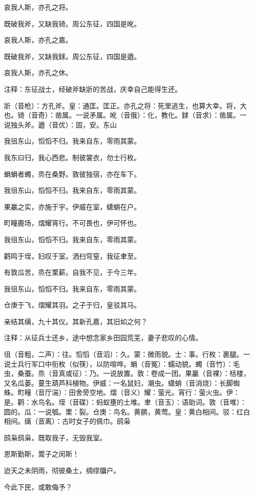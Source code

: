 \documentclass[12pt,UTF8]{ctexbook}
\begin{document}
哀我人斯，亦孔之将。

既破我斧，又缺我锜。周公东征，四国是吪。

哀我人斯，亦孔之嘉。

既破我斧，又缺我銶。周公东征，四国是遒。

哀我人斯，亦孔之休。

注释：东征战士，经破斧缺斨的苦战，庆幸自己能得生还。

斨（音枪）：方孔斧。皇：通匡。匡正。亦孔之将：死里逃生，也算大幸。将，大也。锜（音奇）：凿属。一说矛属。吪（音俄）：化，教化。銶（音求）：凿属。一说独头斧。遒（音优）：固，安。东山

我徂东山，慆慆不归。我来自东，零雨其蒙。

我东曰归，我心西悲。制彼裳衣，勿士行枚。

蜎蜎者蠋，烝在桑野。敦彼独宿，亦在车下。

我徂东山，慆慆不归。我来自东，零雨其蒙。

果臝之实，亦施于宇。伊威在室，蟏蛸在户。

町疃鹿场，熠耀宵行。不可畏也，伊可怀也。

我徂东山，慆慆不归。我来自东，零雨其蒙。

鹳鸣于垤，妇叹于室。洒扫穹窒，我征聿至。

有敦瓜苦，烝在栗薪。自我不见，于今三年。

我徂东山，慆慆不归。我来自东，零雨其蒙。

仓庚于飞，熠耀其羽。之子于归，皇驳其马。

亲结其缡，九十其仪。其新孔嘉，其旧如之何？

注释：从征兵士还乡，途中想念家乡田园荒芜，妻子悲叹的心情。

徂（音粗，二声）：往。慆慆（音滔）：久。蒙：微雨貌。士：事。行枚：裹腿。一说士兵行军口中衔枚（似筷），以防喧哗。蜎（音冤）：蠕动貌。蠋（音竹）：毛虫，桑蚕。烝（音真或征）：乃。一说放置。敦：卷成一团。果臝（音裸）：栝楼，又名瓜蒌。蔓生葫芦科植物。伊威：一名鼠妇，潮虫。蟏蛸（音消烧）：长脚蜘蛛。町疃（音厅湍）：田舍旁空地。熠（音义）耀：萤光。宵行：萤火虫。伊：是。鹳：水鸟名。垤（音碟）：蚂蚁壅的土堆。聿（音玉）：语助词。敦（音堆）：圆的。瓜：一说瓠。栗：裂。仓庚：鸟名。黄鹂，黄莺。皇：黄白相间。驳：红白相间。缡（音离）：古时女子的佩巾。鸱枭

鸱枭鸱枭，既取我子，无毁我室。

恩斯勤斯，鬻子之闵斯！

迨天之未阴雨，彻彼桑土，绸缪牖户。

今此下民，或敢侮予？
\end{document}
